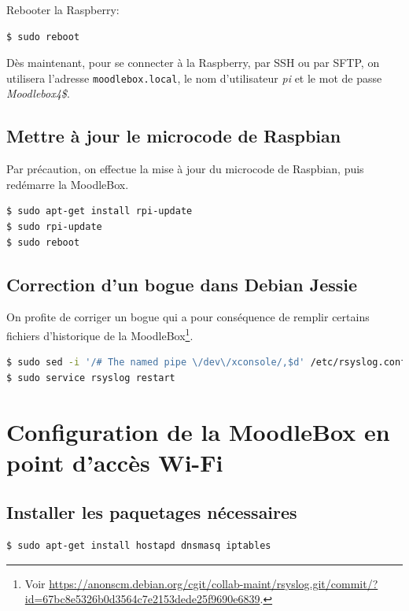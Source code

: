 \documentclass[11pt]{article}
\begin{document}
Rebooter la Raspberry:
\begin{lstlisting}[language=bash]
$ sudo reboot
\end{lstlisting}

Dès maintenant, pour se connecter à la Raspberry, par SSH ou par SFTP, on utilisera l'adresse \lstinline{moodlebox.local}, le nom d'utilisateur \emph{pi} et le mot de passe \emph{Moodlebox4\$}.

\subsection{Mettre à jour le microcode de Raspbian}

Par précaution, on effectue la mise à jour du microcode de Raspbian, puis redémarre la MoodleBox.

\begin{lstlisting}[language=bash]
$ sudo apt-get install rpi-update
$ sudo rpi-update
$ sudo reboot
\end{lstlisting}

\subsection{Correction d'un bogue dans Debian Jessie}

On profite de corriger un bogue qui a pour conséquence de remplir certains fichiers d'historique de la MoodleBox\footnote{Voir \url{https://anonscm.debian.org/cgit/collab-maint/rsyslog.git/commit/?id=67bc8e5326b0d3564c7e2153dede25f9690e6839}.}.

\begin{lstlisting}[language=bash]
$ sudo sed -i '/# The named pipe \/dev\/xconsole/,$d' /etc/rsyslog.conf
$ sudo service rsyslog restart
\end{lstlisting}

\section{Configuration de la MoodleBox en point d'accès Wi-Fi}

\subsection{Installer les paquetages nécessaires}

\begin{lstlisting}[language=bash]
$ sudo apt-get install hostapd dnsmasq iptables
\end{lstlisting}
\end{document}
